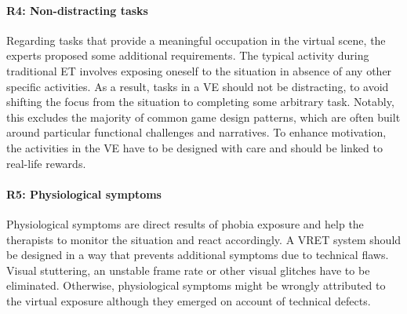 \paragraph{R4: Non-distracting tasks} Regarding tasks that provide a meaningful occupation in the virtual scene, the experts proposed some additional requirements. %
The typical activity during traditional \ac{ET} %
involves exposing oneself to the situation in absence of any other specific activities. As a result, tasks in a \ac{VE} should not be distracting, to avoid shifting the focus from the situation to completing some arbitrary task. Notably, this excludes the majority of common game design patterns, which are often built around particular functional challenges and narratives. To enhance motivation, the activities in the \ac{VE} have to be designed with care and should be linked to real-life rewards. 

\paragraph{R5: Physiological symptoms} Physiological symptoms are direct results of phobia exposure and help the therapists to monitor the situation and react accordingly. A \ac{VRET} system should be designed in a way that prevents additional symptoms due to technical flaws. Visual stuttering, an unstable frame rate or other visual glitches have to be eliminated. Otherwise, physiological symptoms might be wrongly attributed to the virtual exposure although they emerged on account of technical defects.


